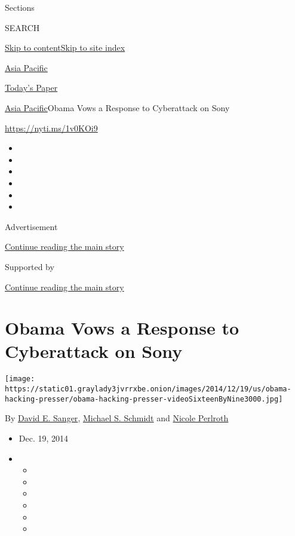 Sections

SEARCH

\protect\hyperlink{site-content}{Skip to
content}\protect\hyperlink{site-index}{Skip to site index}

\href{https://www.nytimes3xbfgragh.onion/section/world/asia}{Asia
Pacific}

\href{https://myaccount.nytimes3xbfgragh.onion/auth/login?response_type=cookie\&client_id=vi}{}

\href{https://www.nytimes3xbfgragh.onion/section/todayspaper}{Today's
Paper}

\href{/section/world/asia}{Asia Pacific}\textbar{}Obama Vows a Response
to Cyberattack on Sony

\url{https://nyti.ms/1v0KOi9}

\begin{itemize}
\item
\item
\item
\item
\item
\item
\end{itemize}

Advertisement

\protect\hyperlink{after-top}{Continue reading the main story}

Supported by

\protect\hyperlink{after-sponsor}{Continue reading the main story}

\hypertarget{obama-vows-a-response-to-cyberattack-on-sony}{%
\section{Obama Vows a Response to Cyberattack on
Sony}\label{obama-vows-a-response-to-cyberattack-on-sony}}

\texttt{[image: https://static01.graylady3jvrrxbe.onion/images/2014/12/19/us/obama-hacking-presser/obama-hacking-presser-videoSixteenByNine3000.jpg]}

By \href{http://www.nytimes3xbfgragh.onion/by/david-e-sanger}{David E.
Sanger},
\href{http://www.nytimes3xbfgragh.onion/by/michael-s-schmidt}{Michael S.
Schmidt} and
\href{http://www.nytimes3xbfgragh.onion/by/nicole-perlroth}{Nicole
Perlroth}

\begin{itemize}
\item
  Dec. 19, 2014
\item
  \begin{itemize}
  \item
  \item
  \item
  \item
  \item
  \item
  \end{itemize}
\end{itemize}

